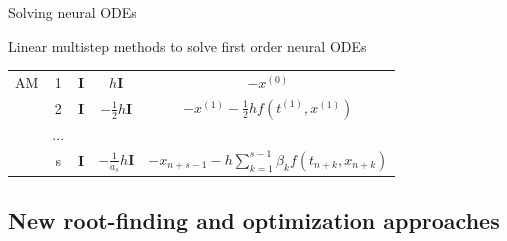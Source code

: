 \documentclass[10pt]{beamer}
\begin{document}
\begin{frame}{Solving neural ODEs}
{\begin{block}{Linear multistep methods to solve first order neural ODEs}
\begin{table}[ht]
\begin{tabular}{ccccc}
		   AM	& 1 & $\mathbf{I}$ & $h \mathbf{I}$ 	 & $-x^{(0)}$ \\
				& 2 & $\mathbf{I}$ & $ -\tfrac{1}{2}h\mathbf{I}$ 	& $-x^{(1)}-\tfrac{1}{2}h f(t^{(1)}, x^{(1)})$ \\
				& ... & & & \\
				& s & $\mathbf{I}$ & $-\tfrac{1}{a_{s}}h\mathbf{I}$ & $-x_{n+s-1} - h \sum_{k=1}^{s-1} \beta_{k} f(t_{n+k}, x_{n+k})$ \\
	        \bottomrule
	    \end{tabular}
	\end{table}

	\end{block}
}
\end{frame}

\subsection{New root-finding and optimization approaches}
\end{document}
